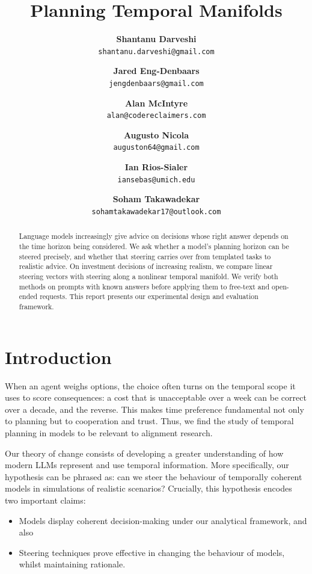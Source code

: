 \documentclass[midterm]{sparreport}
\title{Planning Temporal Manifolds}
\author{
  \textbf{Shantanu Darveshi}\\
  \texttt{shantanu.darveshi@gmail.com}
  \and
  \textbf{Jared Eng-Denbaars}\\
  \texttt{jengdenbaars@gmail.com}
  \and
  \textbf{Alan McIntyre}\\
  \texttt{alan@codereclaimers.com}
  \and
  \textbf{Augusto Nicola}\\
  \texttt{auguston64@gmail.com}
  \and
  \textbf{Ian Rios-Sialer}\\
  \texttt{iansebas@umich.edu}
  \and
  \textbf{Soham Takawadekar}\\
  \texttt{sohamtakawadekar17@outlook.com}
}
\begin{document}
\maketitle

\begin{abstract}
Language models increasingly give advice on decisions whose right answer depends on the time horizon being considered. We ask whether a model's planning horizon can be steered precisely, and whether that steering carries over from templated tasks to realistic advice. On investment decisions of increasing realism, we compare linear steering vectors with steering along a nonlinear temporal manifold. We verify both methods on prompts with known answers before applying them to free-text and open-ended requests. This report presents our experimental design and evaluation framework.
\end{abstract}


\section{Introduction}

When an agent weighs options, the choice often turns on the temporal scope it uses to score consequences: a cost that is unacceptable over a week can be correct over a decade, and the reverse. This makes time preference fundamental not only to planning but to cooperation and trust. Thus, we find the study of temporal planning in models to be relevant to alignment research.

Our theory of change consists of developing a greater understanding of how modern LLMs represent and use temporal information. More specifically, our hypothesis can be phrased as: can we steer the behaviour of temporally coherent models in simulations of realistic scenarios? Crucially, this hypothesis encodes two important claims:
\begin{itemize}
  \item Models display coherent decision-making under our analytical framework, and also
  \item Steering techniques prove effective in changing the behaviour of models, whilst maintaining rationale.
\end{itemize}
\end{document}
